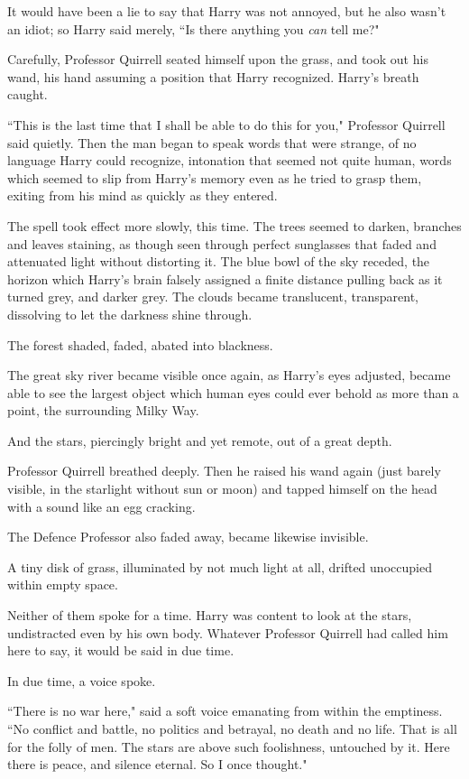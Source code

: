 It would have been a lie to say that Harry was not annoyed, but he also wasn't an idiot; so Harry said merely, ``Is there anything you \emph{can} tell me?"

Carefully, Professor Quirrell seated himself upon the grass, and took out his wand, his hand assuming a position that Harry recognized. Harry's breath caught.

``This is the last time that I shall be able to do this for you," Professor Quirrell said quietly. Then the man began to speak words that were strange, of no language Harry could recognize, intonation that seemed not quite human, words which seemed to slip from Harry's memory even as he tried to grasp them, exiting from his mind as quickly as they entered.

The spell took effect more slowly, this time. The trees seemed to darken, branches and leaves staining, as though seen through perfect sunglasses that faded and attenuated light without distorting it. The blue bowl of the sky receded, the horizon which Harry's brain falsely assigned a finite distance pulling back as it turned grey, and darker grey. The clouds became translucent, transparent, dissolving to let the darkness shine through.

The forest shaded, faded, abated into blackness.

The great sky river became visible once again, as Harry's eyes adjusted, became able to see the largest object which human eyes could ever behold as more than a point, the surrounding Milky Way.

And the stars, piercingly bright and yet remote, out of a great depth.

Professor Quirrell breathed deeply. Then he raised his wand again (just barely visible, in the starlight without sun or moon) and tapped himself on the head with a sound like an egg cracking.

The Defence Professor also faded away, became likewise invisible.

A tiny disk of grass, illuminated by not much light at all, drifted unoccupied within empty space.

Neither of them spoke for a time. Harry was content to look at the stars, undistracted even by his own body. Whatever Professor Quirrell had called him here to say, it would be said in due time.

In due time, a voice spoke.

``There is no war here," said a soft voice emanating from within the emptiness. ``No conflict and battle, no politics and betrayal, no death and no life. That is all for the folly of men. The stars are above such foolishness, untouched by it. Here there is peace, and silence eternal. So I once thought."

